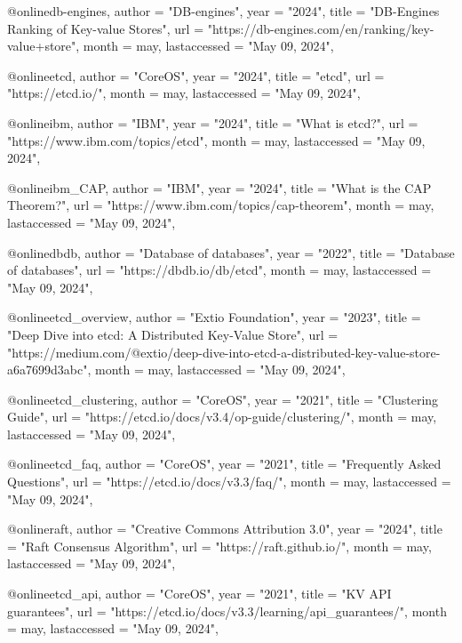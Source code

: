 
@online{db-engines,
author =       "DB-engines",
year =         "2024",
title =        "DB-Engines Ranking of Key-value Stores",
url =          "https://db-engines.com/en/ranking/key-value+store",
month =        may,
lastaccessed = "May 09, 2024",
}

@online{etcd,
author =       "CoreOS",
year =         "2024",
title =        "etcd",
url =          "https://etcd.io/",
month =        may,
lastaccessed = "May 09, 2024",
}

@online{ibm,
author =       "IBM",
year =         "2024",
title =        "What is etcd?",
url =          "https://www.ibm.com/topics/etcd",
month =        may,
lastaccessed = "May 09, 2024",
}

@online{ibm_CAP,
author =       "IBM",
year =         "2024",
title =        "What is the CAP Theorem?",
url =          "https://www.ibm.com/topics/cap-theorem",
month =        may,
lastaccessed = "May 09, 2024",
}

@online{dbdb,
author =       "Database of databases",
year =         "2022",
title =        "Database of databases",
url =          "https://dbdb.io/db/etcd",
month =        may,
lastaccessed = "May 09, 2024",
}


@online{etcd_overview,
author =       "Extio Foundation",
year =         "2023",
title =        "Deep Dive into etcd: A Distributed Key-Value Store",
url =          "https://medium.com/@extio/deep-dive-into-etcd-a-distributed-key-value-store-a6a7699d3abc",
month =        may,
lastaccessed = "May 09, 2024",
}

@online{etcd_clustering,
author =       "CoreOS",
year =         "2021",
title =        "Clustering Guide",
url =          "https://etcd.io/docs/v3.4/op-guide/clustering/",
month =        may,
lastaccessed = "May 09, 2024",
}

@online{etcd_faq,
author =       "CoreOS",
year =         "2021",
title =        "Frequently Asked Questions",
url =          "https://etcd.io/docs/v3.3/faq/",
month =        may,
lastaccessed = "May 09, 2024",
}

@online{raft,
author =       "Creative Commons Attribution 3.0",
year =         "2024",
title =        "Raft Consensus Algorithm",
url =          "https://raft.github.io/",
month =        may,
lastaccessed = "May 09, 2024",
}

@online{etcd_api,
author =       "CoreOS",
year =         "2021",
title =        "KV API guarantees",
url =          "https://etcd.io/docs/v3.3/learning/api_guarantees/",
month =        may,
lastaccessed = "May 09, 2024",
}


